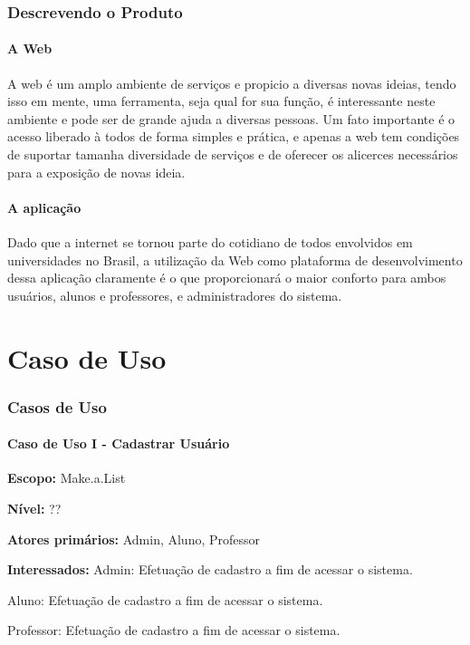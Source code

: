 \documentclass[12pt,oneside,a4paper,article]{abntex2}
\begin{document}
	\section{Descrevendo o Produto}
		
		\subsection{A Web}
			A web é um amplo ambiente de serviços e propicio a diversas novas ideias, tendo isso em mente, uma ferramenta, seja qual for sua função, é interessante neste ambiente e pode ser de grande ajuda a diversas pessoas. Um fato importante é o acesso liberado à todos de forma simples e prática, e apenas a web tem condições de suportar tamanha diversidade de serviços e de oferecer os alicerces necessários para a exposição de novas ideia. 
		
		\subsection{A aplicação}
			Dado que a internet se tornou parte do cotidiano de todos envolvidos em universidades no Brasil, a utilização da Web como plataforma de desenvolvimento dessa aplicação claramente é o que proporcionará o maior conforto para ambos usuários, alunos e professores, e administradores do sistema. 
			
			
			
\part{Caso de Uso}
	\section{Casos de Uso}
		
		\subsection{Caso de Uso I - Cadastrar Usuário}
		
		\textbf{Escopo:} Make.a.List 
		
		\textbf{Nível:} ??
		
		\textbf{Atores primários:} Admin, Aluno, Professor
		
		\textbf{Interessados:} Admin: Efetuação de cadastro a fim de acessar o sistema. 
		
		Aluno: Efetuação de cadastro a fim de acessar o sistema.
		
		Professor: Efetuação de cadastro a fim de acessar o sistema.
		
\end{document}
